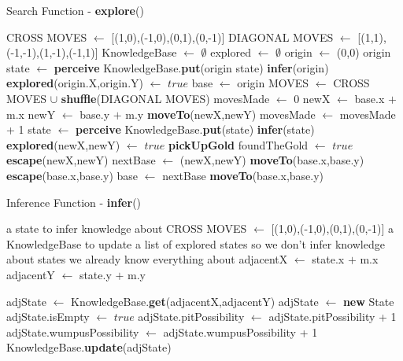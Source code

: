 \documentclass[11pt,a4paper]{article}
\begin{document}
\begin{algorithm}
\caption{Search Function - \textbf{explore}()}
\label{explore}
\begin{algorithmic}[1]
\REQUIRE CROSS MOVES $\leftarrow$ [(1,0),(-1,0),(0,1),(0,-1)]
\REQUIRE DIAGONAL MOVES $\leftarrow$ [(1,1),(-1,-1),(1,-1),(-1,1)]
\STATE KnowledgeBase $\leftarrow$ $\emptyset$
\STATE explored $\leftarrow$ $\emptyset$
\STATE
\STATE origin $\leftarrow$ (0,0)
\STATE origin state $\leftarrow$ \textbf{perceive}
\STATE KnowledgeBase.\textbf{put}(origin state)
\STATE \textbf{infer}(origin)
\STATE \textbf{explored}(origin.X,origin.Y) $\leftarrow$ $true$
\STATE base $\leftarrow$ origin
\STATE
\LOOP
\STATE MOVES $\leftarrow$ CROSS MOVES $\cup$ \textbf{shuffle}(DIAGONAL MOVES)
\STATE movesMade $\leftarrow$ 0
\STATE newX $\leftarrow$ base.x $+$ m.x 
\STATE newY $\leftarrow$ base.y $+$ m.y
\STATE \textbf{moveTo}(newX,newY)
\STATE movesMade $\leftarrow$ movesMade + 1
\STATE state $\leftarrow$ \textbf{perceive}
\STATE KnowledgeBase.\textbf{put}(state)
\STATE \textbf{infer}(state)
\STATE \textbf{explored}(newX,newY) $\leftarrow$ $true$
\STATE \textbf{pickUpGold}
\STATE foundTheGold $\leftarrow$ $true$
\STATE \textbf{escape}(newX,newY)
\ENDIF
{}
\STATE nextBase $\leftarrow$ (newX,newY)
\ENDIF
\STATE \textbf{moveTo}(base.x,base.y)
\ENDIF
\ENDFOR
{}
\STATE \textbf{escape}(base.x,base.y)
\ENDIF
\STATE base $\leftarrow$ nextBase
\STATE \textbf{moveTo}(base.x,base.y)
\ENDLOOP
\end{algorithmic}
\end{algorithm}

\newpage

\begin{algorithm}
\caption{Inference Function - \textbf{infer}()}
\label{infer}
\begin{algorithmic}[1]
\REQUIRE a state to infer knowledge about
\REQUIRE CROSS MOVES $\leftarrow$ [(1,0),(-1,0),(0,1),(0,-1)]
\REQUIRE a KnowledgeBase to update
\REQUIRE a list of explored states so we don't infer knowledge about states we already know everything about
\STATE adjacentX $\leftarrow$ state.x $+$ m.x 
\STATE adjacentY $\leftarrow$ state.y $+$ m.y

\STATE adjState $\leftarrow$ KnowledgeBase.\textbf{get}(adjacentX,adjacentY)
\ELSE
\STATE adjState $\leftarrow$ \textbf{new} State
\ENDIF
\STATE
{}
\STATE adjState.isEmpty $\leftarrow$ $true$
\ELSE
{}
\STATE adjState.pitPossibility $\leftarrow$ adjState.pitPossibility + 1
\ENDIF
{}
\STATE adjState.wumpusPossibility $\leftarrow$ adjState.wumpusPossibility + 1
\ENDIF
\ENDIF
\ENDIF
\STATE KnowledgeBase.\textbf{update}(adjState)
\ENDFOR
\end{algorithmic}
\end{algorithm}
\end{document}
